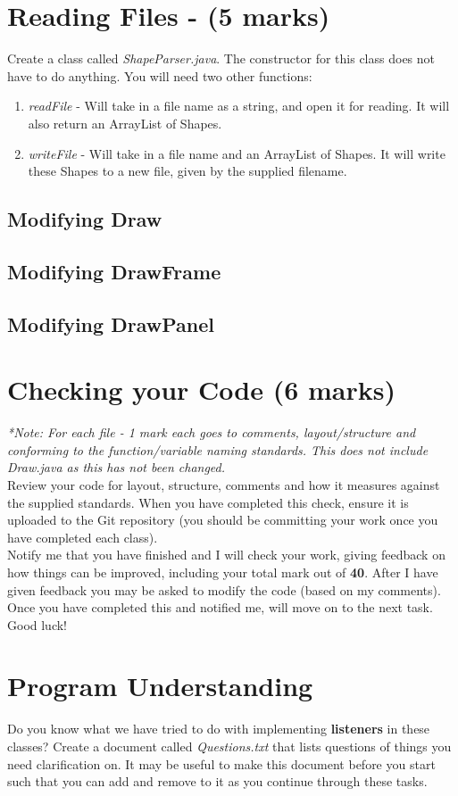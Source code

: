 \documentclass[a4paper,12pt]{article}
\begin{document}
\newpage
\section{Reading Files - (5 marks)}
Create a class called \textit{ShapeParser.java}. The constructor for this class does not have to do anything. You will need two other functions:
\begin{enumerate}
\item \textit{readFile} - Will take in a file name as a string, and open it for reading. It will also return an ArrayList of Shapes.
\item \textit{writeFile} - Will take in a file name and an ArrayList of Shapes. It will write these Shapes to a new file, given by the supplied filename.
\end{enumerate}

\subsection{Modifying Draw}

\subsection{Modifying DrawFrame}

\subsection{Modifying DrawPanel}


\newpage
\section{Checking your Code (6 marks)}
\textit{*Note: For each file - 1 mark each goes to comments, layout/structure and conforming to the function/variable naming standards. This does not include Draw.java as this has not been changed.}\\

Review your code for layout, structure, comments and how it measures against the supplied standards. When you have completed this check, ensure it is uploaded to the Git repository (you should be committing your work once you have completed each class).\\

Notify me that you have finished and I will check your work, giving feedback on how things can be improved, including your total mark out of {\bf 40}. After I have given feedback you may be asked to modify the code (based on my comments). Once you have completed this and notified me, will move on to the next task. Good luck!

\vspace{0.5cm}
\section{Program Understanding}
Do you know what we have tried to do with implementing {\bf listeners} in these classes? Create a document called \textit{Questions.txt} that lists questions of things you need clarification on. It may be useful to make this document before you start such that you can add and remove to it as you continue through these tasks.
\end{document}
